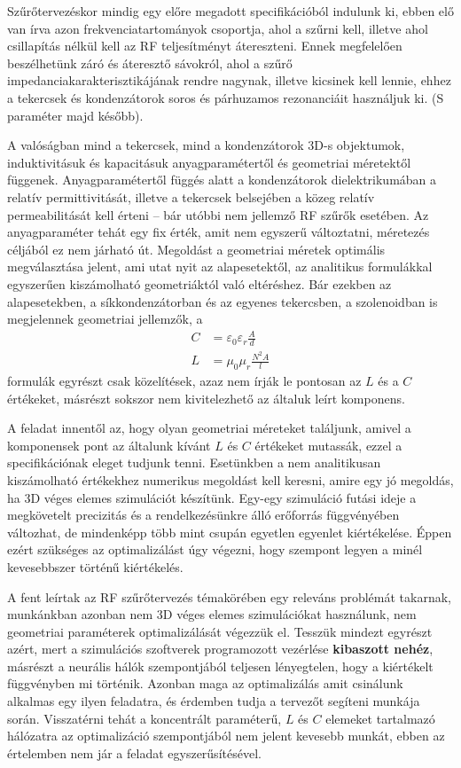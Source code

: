 		Szűrőtervezéskor mindig egy előre megadott specifikációból indulunk ki, ebben elő van írva azon frekvenciatartományok csoportja, ahol a szűrni kell, illetve ahol csillapítás nélkül kell az RF teljesítményt átereszteni. Ennek megfelelően beszélhetünk záró és áteresztő sávokról, ahol a szűrő impedanciakarakterisztikájának rendre nagynak, illetve kicsinek kell lennie, ehhez a tekercsek és kondenzátorok soros és párhuzamos rezonanciáit használjuk ki. (S paraméter majd később).
		
		A valóságban mind a tekercsek, mind a kondenzátorok 3D-s objektumok, induktivitásuk és kapacitásuk anyagparamétertől és geometriai méretektől függenek. Anyagparamétertől függés alatt a kondenzátorok dielektrikumában a relatív permittivitását, illetve a tekercsek belsejében a közeg relatív permeabilitását kell érteni -- bár utóbbi nem jellemző RF szűrők esetében. Az anyagparaméter tehát egy fix érték, amit nem egyszerű változtatni, méretezés céljából ez nem járható út. Megoldást a geometriai méretek optimális megválasztása jelent, ami utat nyit az alapesetektől, az analitikus formulákkal egyszerűen kiszámolható geometriáktól való eltéréshez. Bár ezekben az alapesetekben, a síkkondenzátorban és az egyenes tekercsben, a szolenoidban is megjelennek geometriai jellemzők, a
\begin{align*}
	C &= \varepsilon_{0}\varepsilon_{r}\frac{A}{d}\\
	L &= \mu_{0}\mu_{r}\frac{N^{2}A}{l}
\end{align*}
formulák egyrészt csak közelítések, azaz nem írják le pontosan az $L$ és a $C$ értékeket, másrészt sokszor nem kivitelezhető az általuk leírt komponens.
		
		A feladat innentől az, hogy olyan geometriai méreteket találjunk, amivel a komponensek pont az általunk kívánt $L$ és $C$ értékeket mutassák, ezzel a specifikációnak eleget tudjunk tenni. Esetünkben a nem analitikusan kiszámolható értékekhez numerikus megoldást kell keresni, amire egy jó megoldás, ha 3D véges elemes szimulációt készítünk. Egy-egy szimuláció futási ideje a megkövetelt precizitás és a rendelkezésünkre álló erőforrás függvényében változhat, de mindenképp több mint csupán egyetlen egyenlet kiértékelése. Éppen ezért szükséges az optimalizálást úgy végezni, hogy szempont legyen a minél kevesebbszer történű kiértékelés. 
		
		A fent leírtak az RF szűrőtervezés témakörében egy releváns problémát takarnak, munkánkban azonban nem 3D véges elemes szimulációkat használunk, nem geometriai paraméterek optimalizálását végezzük el. Tesszük mindezt egyrészt azért, mert a szimulációs szoftverek programozott vezérlése \textbf{kibaszott nehéz}, másrészt a neurális hálók szempontjából teljesen lényegtelen, hogy a kiértékelt függvényben mi történik. Azonban maga az optimalizálás amit csinálunk alkalmas egy ilyen feladatra, és érdemben tudja a tervezőt segíteni munkája során. Visszatérni tehát a koncentrált paraméterű, $L$ és $C$ elemeket tartalmazó hálózatra az optimalizáció szempontjából nem jelent kevesebb munkát, ebben az értelemben nem jár a feladat egyszerűsítésével.
		
